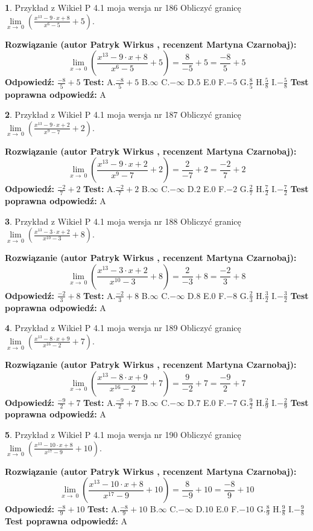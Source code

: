 \documentclass[12pt, a4paper]{article}
\theoremstyle{definition} %
\newtheorem{zad}{}
\newcommand{\zadStart}[1]{\begin{zad}#1\newline}
\newcommand{\zadStop}{\end{zad}}
\newcommand{\rozwStart}[2]{\noindent \textbf{Rozwiązanie (autor #1 , recenzent #2): }\newline}
\newcommand{\rozwStop}{\newline}
\newcommand{\odpStart}{\noindent \textbf{Odpowiedź:}\newline}
\newcommand{\odpStop}{\newline}
\newcommand{\testStart}{\noindent \textbf{Test:}\newline}
\newcommand{\testStop}{\newline}
\newcommand{\kluczStart}{\noindent \textbf{Test poprawna odpowiedź:}\newline}
\newcommand{\kluczStop}{\newline}
\begin{document}
\zadStart{Przykład z Wikieł P 4.1 moja wersja nr 186}
Obliczyć granicę $\lim\limits_{x\to\ 0}(\frac{x^{13}-9 \cdot x +8}{x^{6}-5}+5)$.
\zadStop
\rozwStart{Patryk Wirkus}{Martyna Czarnobaj}
$$\lim\limits_{x\to\ 0}(\frac{x^{13}-9 \cdot x +8}{x^{6}-5}+5)=\frac{8}{-5}+5=\frac{-8}{5}+5$$
\rozwStop
\odpStart
$\frac{-8}{5}+5$
\odpStop
\testStart
A.$\frac{-8}{5}+5$
B.$\infty$
C.$-\infty$
D.$5$
E.$0$
F.$-5$
G.$\frac{8}{5}$
H.$\frac{5}{8}$
I.$-\frac{5}{8}$
\testStop
\kluczStart
A
\kluczStop



\zadStart{Przykład z Wikieł P 4.1 moja wersja nr 187}
Obliczyć granicę $\lim\limits_{x\to\ 0}(\frac{x^{13}-9 \cdot x +2}{x^{9}-7}+2)$.
\zadStop
\rozwStart{Patryk Wirkus}{Martyna Czarnobaj}
$$\lim\limits_{x\to\ 0}(\frac{x^{13}-9 \cdot x +2}{x^{9}-7}+2)=\frac{2}{-7}+2=\frac{-2}{7}+2$$
\rozwStop
\odpStart
$\frac{-2}{7}+2$
\odpStop
\testStart
A.$\frac{-2}{7}+2$
B.$\infty$
C.$-\infty$
D.$2$
E.$0$
F.$-2$
G.$\frac{2}{7}$
H.$\frac{7}{2}$
I.$-\frac{7}{2}$
\testStop
\kluczStart
A
\kluczStop



\zadStart{Przykład z Wikieł P 4.1 moja wersja nr 188}
Obliczyć granicę $\lim\limits_{x\to\ 0}(\frac{x^{13}-3 \cdot x +2}{x^{10}-3}+8)$.
\zadStop
\rozwStart{Patryk Wirkus}{Martyna Czarnobaj}
$$\lim\limits_{x\to\ 0}(\frac{x^{13}-3 \cdot x +2}{x^{10}-3}+8)=\frac{2}{-3}+8=\frac{-2}{3}+8$$
\rozwStop
\odpStart
$\frac{-2}{3}+8$
\odpStop
\testStart
A.$\frac{-2}{3}+8$
B.$\infty$
C.$-\infty$
D.$8$
E.$0$
F.$-8$
G.$\frac{2}{3}$
H.$\frac{3}{2}$
I.$-\frac{3}{2}$
\testStop
\kluczStart
A
\kluczStop



\zadStart{Przykład z Wikieł P 4.1 moja wersja nr 189}
Obliczyć granicę $\lim\limits_{x\to\ 0}(\frac{x^{13}-8 \cdot x +9}{x^{16}-2}+7)$.
\zadStop
\rozwStart{Patryk Wirkus}{Martyna Czarnobaj}
$$\lim\limits_{x\to\ 0}(\frac{x^{13}-8 \cdot x +9}{x^{16}-2}+7)=\frac{9}{-2}+7=\frac{-9}{2}+7$$
\rozwStop
\odpStart
$\frac{-9}{2}+7$
\odpStop
\testStart
A.$\frac{-9}{2}+7$
B.$\infty$
C.$-\infty$
D.$7$
E.$0$
F.$-7$
G.$\frac{9}{2}$
H.$\frac{2}{9}$
I.$-\frac{2}{9}$
\testStop
\kluczStart
A
\kluczStop



\zadStart{Przykład z Wikieł P 4.1 moja wersja nr 190}
Obliczyć granicę $\lim\limits_{x\to\ 0}(\frac{x^{13}-10 \cdot x +8}{x^{17}-9}+10)$.
\zadStop
\rozwStart{Patryk Wirkus}{Martyna Czarnobaj}
$$\lim\limits_{x\to\ 0}(\frac{x^{13}-10 \cdot x +8}{x^{17}-9}+10)=\frac{8}{-9}+10=\frac{-8}{9}+10$$
\rozwStop
\odpStart
$\frac{-8}{9}+10$
\odpStop
\testStart
A.$\frac{-8}{9}+10$
B.$\infty$
C.$-\infty$
D.$10$
E.$0$
F.$-10$
G.$\frac{8}{9}$
H.$\frac{9}{8}$
I.$-\frac{9}{8}$
\testStop
\kluczStart
A
\kluczStop
\end{document}
